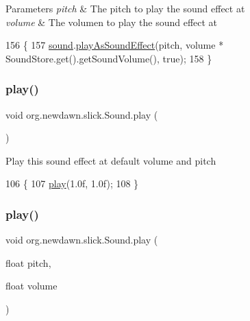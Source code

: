 \begin{DoxyParams}{Parameters}
{\em pitch} & The pitch to play the sound effect at \\
\hline
{\em volume} & The volumen to play the sound effect at \\
\hline
\end{DoxyParams}

\begin{DoxyCode}
156                                                 \{
157         \mbox{\hyperlink{classorg_1_1newdawn_1_1slick_1_1_sound_aefd4460784b86c7003356f59cafe3dc8}{sound}}.\mbox{\hyperlink{interfaceorg_1_1newdawn_1_1slick_1_1openal_1_1_audio_a69c3621a4a4bcbe9f1711f569c54017b}{playAsSoundEffect}}(pitch, volume * SoundStore.get().getSoundVolume(), \textcolor{keyword}{
      true});
158     \}
\end{DoxyCode}
\mbox{\label{classorg_1_1newdawn_1_1slick_1_1_sound_aed5db39a69e8ed57eb14053f7588ab90}} 
\subsubsection{\texorpdfstring{play()}{play()}\hspace{0.1cm}{\footnotesize\ttfamily [1/2]}}
{\footnotesize\ttfamily void org.\+newdawn.\+slick.\+Sound.\+play (\begin{DoxyParamCaption}{ }\end{DoxyParamCaption})\hspace{0.3cm}{\ttfamily [inline]}}

Play this sound effect at default volume and pitch 
\begin{DoxyCode}
106                        \{
107         \mbox{\hyperlink{classorg_1_1newdawn_1_1slick_1_1_sound_aed5db39a69e8ed57eb14053f7588ab90}{play}}(1.0f, 1.0f);
108     \}
\end{DoxyCode}
\mbox{\label{classorg_1_1newdawn_1_1slick_1_1_sound_ad3baa12034e6998bdd534085edb21cdb}} 
\subsubsection{\texorpdfstring{play()}{play()}\hspace{0.1cm}{\footnotesize\ttfamily [2/2]}}
{\footnotesize\ttfamily void org.\+newdawn.\+slick.\+Sound.\+play (\begin{DoxyParamCaption}\item[{float}]{pitch,  }\item[{float}]{volume }\end{DoxyParamCaption})\hspace{0.3cm}{\ttfamily [inline]}}

